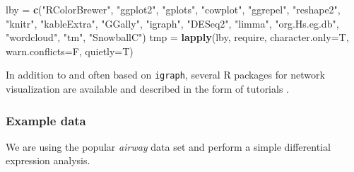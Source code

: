 \documentclass[9pt,a4paper,]{extarticle}
\newenvironment{Shaded}{\begin{snugshade}}{\end{snugshade}}
\newcommand{\KeywordTok}[1]{\textcolor[rgb]{0.13,0.29,0.53}{\textbf{#1}}}
\newcommand{\DataTypeTok}[1]{\textcolor[rgb]{0.13,0.29,0.53}{#1}}
\newcommand{\StringTok}[1]{\textcolor[rgb]{0.31,0.60,0.02}{#1}}
\newcommand{\OperatorTok}[1]{\textcolor[rgb]{0.81,0.36,0.00}{\textbf{#1}}}
\newcommand{\NormalTok}[1]{#1}
\theoremstyle{definition}
\theoremstyle{definition}
\theoremstyle{definition}
\theoremstyle{remark}
\begin{document}
\begin{Shaded}
\begin{Highlighting}[]
\NormalTok{lby =}\StringTok{ }\KeywordTok{c}\NormalTok{(}\StringTok{"RColorBrewer"}\NormalTok{, }\StringTok{"ggplot2"}\NormalTok{, }\StringTok{"gplots"}\NormalTok{, }\StringTok{"cowplot"}\NormalTok{, }
        \StringTok{"ggrepel"}\NormalTok{, }\StringTok{"reshape2"}\NormalTok{, }\StringTok{"knitr"}\NormalTok{, }\StringTok{"kableExtra"}\NormalTok{,}
        \StringTok{"GGally"}\NormalTok{, }\StringTok{"igraph"}\NormalTok{, }\StringTok{"DESeq2"}\NormalTok{, }\StringTok{"limma"}\NormalTok{, }\StringTok{"org.Hs.eg.db"}\NormalTok{, }
        \StringTok{"wordcloud"}\NormalTok{, }\StringTok{"tm"}\NormalTok{, }\StringTok{"SnowballC"}\NormalTok{)}
\NormalTok{tmp =}\StringTok{ }\KeywordTok{lapply}\NormalTok{(lby, require, }\DataTypeTok{character.only=}\NormalTok{T, }\DataTypeTok{warn.conflicts=}\NormalTok{F, }\DataTypeTok{quietly=}\NormalTok{T)}
\end{Highlighting}
\end{Shaded}

In addition to and often based on \texttt{igraph}, several R packages for network visualization are available and described in the form of tutorials \citep{Ognyanova2015, Tyner2017}.

\subsubsection{Example data}\label{example-data}

We are using the popular \emph{airway} data set and perform a simple differential expression analysis.

\begin{Shaded}
\end{Shaded}
\end{document}
